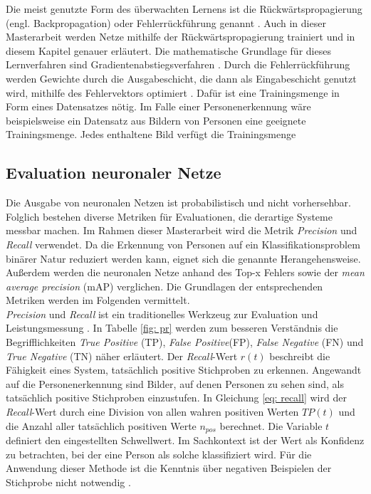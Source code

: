 		Die meist genutzte Form des überwachten Lernens ist die Rückwärtspropagierung (engl. Backpropagation) oder Fehlerrückführung genannt \cite{Ertel}. Auch in dieser Masterarbeit werden Netze mithilfe der Rückwärtspropagierung trainiert und in diesem Kapitel genauer erläutert. Die mathematische Grundlage für dieses Lernverfahren sind Gradientenabstiegsverfahren \cite{Kriesel}. Durch die Fehlerrückführung werden Gewichte durch die Ausgabeschicht, die dann als Eingabeschicht genutzt wird, mithilfe des Fehlervektors optimiert \cite{Kriesel}. Dafür ist eine Trainingsmenge in Form eines Datensatzes nötig. Im Falle einer Personenerkennung wäre beispielsweise ein Datensatz aus Bildern von Personen eine geeignete Trainingsmenge. Jedes enthaltene Bild verfügt die Trainingsmenge\\
		
	
		
		\subsection{Evaluation neuronaler Netze}
		Die Ausgabe von neuronalen Netzen ist probabilistisch und nicht vorhersehbar. Folglich bestehen diverse Metriken für Evaluationen, die derartige Systeme messbar machen. Im Rahmen dieser Masterarbeit wird die Metrik \textit{Precision} und \textit{Recall} verwendet. Da die Erkennung von Personen auf ein Klassifikationsproblem binärer Natur reduziert werden kann, eignet sich die genannte Herangehensweise. Außerdem werden die neuronalen Netze anhand des Top-x Fehlers sowie der \textit{mean average precision} (mAP) verglichen. Die Grundlagen der entsprechenden Metriken werden im Folgenden vermittelt.\\
		
		
		
		\textit{Precision} und \textit{Recall} ist ein traditionelles Werkzeug zur Evaluation und Leistungsmessung \cite{precisionandrecall}. In Tabelle \ref{fig: pr} werden zum besseren Verständnis die Begrifflichkeiten \textit{True Positive} (TP), \textit{False Positive}(FP), \textit{False Negative} (FN) und \textit{True Negative} (TN) näher erläutert. Der \textit{Recall}-Wert $r(t)$ beschreibt die Fähigkeit eines System, tatsächlich positive Stichproben zu erkennen. Angewandt auf die Personenerkennung sind Bilder, auf denen Personen zu sehen sind, als tatsächlich positive Stichproben einzustufen. In Gleichung \ref{eq: recall} wird der \textit{Recall}-Wert durch eine Division von allen wahren positiven Werten $TP(t)$ und die Anzahl aller tatsächlich positiven Werte $n_{pos}$ berechnet. Die Variable $t$ definiert den eingestellten Schwellwert. Im Sachkontext ist der Wert als Konfidenz zu betrachten, bei der eine Person als solche klassifiziert wird. Für die Anwendung dieser Methode ist die Kenntnis über negativen Beispielen der Stichprobe nicht notwendig \cite{bildundobjekt}.\\ 
		
